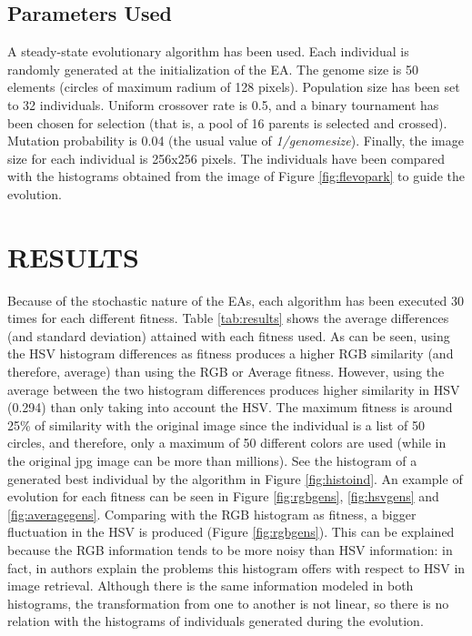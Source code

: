 \documentclass[a4paper,twoside]{article}
\begin{document}
\subsection{Parameters Used}

A steady-state evolutionary algorithm has been used. Each individual is randomly generated at the initialization of the EA. The genome size is 50 elements (circles of maximum radium of 128 pixels). Population size has been set to 32 individuals. Uniform crossover rate is 0.5, and a binary tournament has been chosen for selection (that is, a pool of 16 parents is selected and crossed). Mutation probability is 0.04 (the usual value of {\em 1/genomesize}). Finally, the image size for each individual is 256x256 pixels. The individuals have been compared with the histograms obtained from the image of Figure \ref{fig:flevopark} to guide the evolution. 

\section{\uppercase{RESULTS}}
\label{sec:results}

\noindent Because of the stochastic nature of the EAs, each algorithm has been executed 30 times for each different fitness. Table \ref{tab:results} shows the average differences (and standard deviation) attained with each fitness used. As can be seen, using the HSV histogram differences as fitness produces a higher RGB similarity (and therefore, average) than using the RGB or Average fitness. However, using the average between the two histogram differences produces higher similarity in HSV (0.294) than only taking into account the HSV. The maximum fitness is around 25\% of similarity with the original image since the individual is a list of 50 circles, and therefore, only a maximum of 50 different colors are used (while in the original jpg image can be more than millions). See the histogram of a generated best individual by the algorithm in Figure \ref{fig:histoind}. An example of evolution for each fitness can be seen in Figure \ref{fig:rgbgens}, \ref{fig:hsvgens} and \ref{fig:averagegens}. Comparing with the RGB histogram as fitness, a bigger fluctuation in the HSV is produced (Figure \ref{fig:rgbgens}). This can be explained because the RGB information tends to be more noisy than HSV information: in fact, in \cite{COLORDIFFERENCES} authors explain the problems this histogram offers with respect to HSV in image retrieval. Although there is the same information modeled in both histograms, the transformation from one to another is not linear, so there is no relation with the histograms of individuals generated during the evolution.
\end{document}
